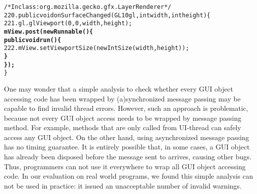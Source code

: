 \begin{CodeOut}
\begin{alltt}
     /* In class: org.mozilla.gecko.gfx.LayerRenderer */
220. public void onSurfaceChanged(GL10 gl, int width, int height) \{
221.     gl.glViewport(0, 0, width, height);
         \textbf{mView.post(new Runnable() \{}
             \textbf{public void run() \{}
222.             mView.setViewportSize(new IntSize(width, height));
             \textbf{\}}
         \textbf{\});}
     \}
\end{alltt}
\end{CodeOut}

One may wonder that a simple analysis to check whether every GUI object
accessing code has been wrapped by (a)synchronized message passing may
be capable to find invalid thread errors. However, such an approach is problematic,
because not every GUI object access needs to be wrapped by message passing
method. For example, methods that are only called from UI-thread can safely
access any GUI object. On the other hand, using asynchronized message passing has no timing
guarantee. It is entirely possible that, in some cases, a GUI object has already been
disposed before the message sent to arrives, causing other bugs. 
Thus, programmers can not use it everywhere to wrap all GUI object accessing code.
In our evaluation on real world programs, we found this simple analysis 
can not be used in practice: it issued
an unacceptable number of invalid warnings. %




